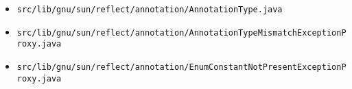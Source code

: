 \documentclass[a4paper, 10pt, titlepage]{scrartcl} %
\begin{document}
\begin{itemize}
 \item \begin{scriptsize}\verb|src|\hspace{0.0pt}\verb|/|\hspace{0.0pt}\verb|lib|\hspace{0.0pt}\verb|/|\hspace{0.0pt}\verb|gnu|\hspace{0.0pt}\verb|/|\hspace{0.0pt}\verb|sun|\hspace{0.0pt}\verb|/|\hspace{0.0pt}\verb|reflect|\hspace{0.0pt}\verb|/|\hspace{0.0pt}\verb|annotation|\hspace{0.0pt}\verb|/|\hspace{0.0pt}\verb|AnnotationType|\hspace{0.0pt}\verb|.|\hspace{0.0pt}\verb|java|\end{scriptsize}
 \item \begin{scriptsize}\verb|src|\hspace{0.0pt}\verb|/|\hspace{0.0pt}\verb|lib|\hspace{0.0pt}\verb|/|\hspace{0.0pt}\verb|gnu|\hspace{0.0pt}\verb|/|\hspace{0.0pt}\verb|sun|\hspace{0.0pt}\verb|/|\hspace{0.0pt}\verb|reflect|\hspace{0.0pt}\verb|/|\hspace{0.0pt}\verb|annotation|\hspace{0.0pt}\verb|/|\hspace{0.0pt}\verb|AnnotationTypeMismatchExceptionProxy|\hspace{0.0pt}\verb|.|\hspace{0.0pt}\verb|java|\end{scriptsize}
 \item \begin{scriptsize}\verb|src|\hspace{0.0pt}\verb|/|\hspace{0.0pt}\verb|lib|\hspace{0.0pt}\verb|/|\hspace{0.0pt}\verb|gnu|\hspace{0.0pt}\verb|/|\hspace{0.0pt}\verb|sun|\hspace{0.0pt}\verb|/|\hspace{0.0pt}\verb|reflect|\hspace{0.0pt}\verb|/|\hspace{0.0pt}\verb|annotation|\hspace{0.0pt}\verb|/|\hspace{0.0pt}\verb|EnumConstantNotPresentExceptionProxy|\hspace{0.0pt}\verb|.|\hspace{0.0pt}\verb|java|\end{scriptsize}

\end{itemize}
\end{document}
